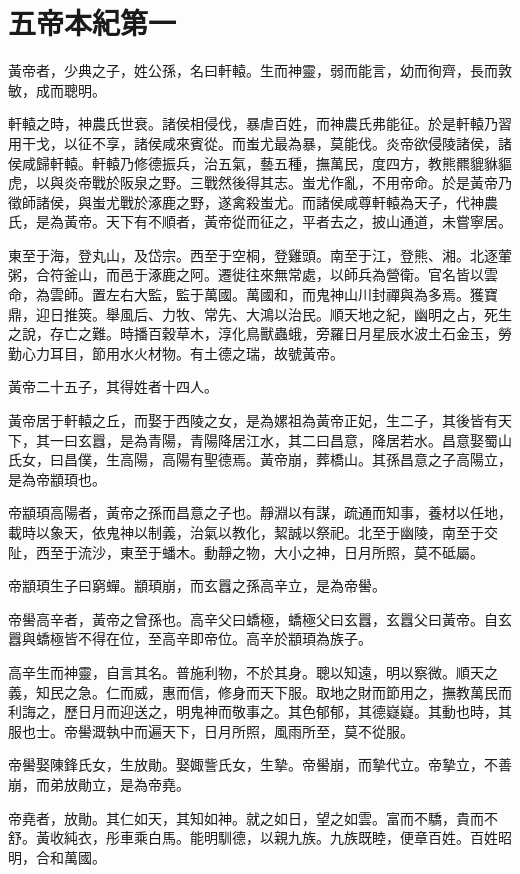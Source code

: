 \chapter{五帝本紀第一}

黃帝者，少典之子，姓公孫，名曰軒轅。生而神靈，弱而能言，幼而徇齊，長而敦敏，成而聰明。

軒轅之時，神農氏世衰。諸侯相侵伐，暴虐百姓，而神農氏弗能征。於是軒轅乃習用干戈，以征不享，諸侯咸來賓從。而蚩尤最為暴，莫能伐。炎帝欲侵陵諸侯，諸侯咸歸軒轅。軒轅乃修德振兵，治五氣，藝五種，撫萬民，度四方，教熊羆貔貅貙虎，以與炎帝戰於阪泉之野。三戰然後得其志。蚩尤作亂，不用帝命。於是黃帝乃徵師諸侯，與蚩尤戰於涿鹿之野，遂禽殺蚩尤。而諸侯咸尊軒轅為天子，代神農氏，是為黃帝。天下有不順者，黃帝從而征之，平者去之，披山通道，未嘗寧居。

東至于海，登丸山，及岱宗。西至于空桐，登雞頭。南至于江，登熊、湘。北逐葷粥，合符釜山，而邑于涿鹿之阿。遷徙往來無常處，以師兵為營衛。官名皆以雲命，為雲師。置左右大監，監于萬國。萬國和，而鬼神山川封禪與為多焉。獲寶鼎，迎日推筴。舉風后、力牧、常先、大鴻以治民。順天地之紀，幽明之占，死生之說，存亡之難。時播百穀草木，淳化鳥獸蟲蛾，旁羅日月星辰水波土石金玉，勞勤心力耳目，節用水火材物。有土德之瑞，故號黃帝。

黃帝二十五子，其得姓者十四人。

黃帝居于軒轅之丘，而娶于西陵之女，是為嫘祖為黃帝正妃，生二子，其後皆有天下，其一曰玄囂，是為青陽，青陽降居江水，其二曰昌意，降居若水。昌意娶蜀山氏女，曰昌僕，生高陽，高陽有聖德焉。黃帝崩，葬橋山。其孫昌意之子高陽立，是為帝顓頊也。

帝顓頊高陽者，黃帝之孫而昌意之子也。靜淵以有謀，疏通而知事，養材以任地，載時以象天，依鬼神以制義，治氣以教化，絜誠以祭祀。北至于幽陵，南至于交阯，西至于流沙，東至于蟠木。動靜之物，大小之神，日月所照，莫不砥屬。

帝顓頊生子曰窮蟬。顓頊崩，而玄囂之孫高辛立，是為帝嚳。

帝嚳高辛者，黃帝之曾孫也。高辛父曰蟜極，蟜極父曰玄囂，玄囂父曰黃帝。自玄囂與蟜極皆不得在位，至高辛即帝位。高辛於顓頊為族子。

高辛生而神靈，自言其名。普施利物，不於其身。聰以知遠，明以察微。順天之義，知民之急。仁而威，惠而信，修身而天下服。取地之財而節用之，撫教萬民而利誨之，歷日月而迎送之，明鬼神而敬事之。其色郁郁，其德嶷嶷。其動也時，其服也士。帝嚳溉執中而遍天下，日月所照，風雨所至，莫不從服。

帝嚳娶陳鋒氏女，生放勛。娶娵訾氏女，生摯。帝嚳崩，而摯代立。帝摯立，不善崩，而弟放勛立，是為帝堯。

帝堯者，放勛。其仁如天，其知如神。就之如日，望之如雲。富而不驕，貴而不舒。黃收純衣，彤車乘白馬。能明馴德，以親九族。九族既睦，便章百姓。百姓昭明，合和萬國。

